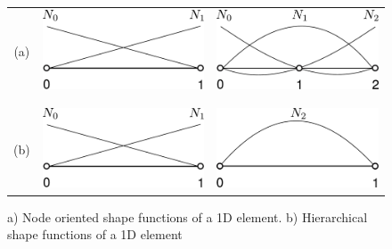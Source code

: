 \documentclass[11pt]{acmeArticle}
\numberwithin{equation}{section}
\begin{document}
\begin{figure}[h!]
\begin{center}
\begin{tabular}{c c c}
(a) & \includegraphics[height=2.cm]{Figures/LinearShapeFunction.pdf}  & {\includegraphics[height=2.cm]{Figures/2ndOrderNodeOr.pdf}}\\  
 &  & \\  
  &  & \\
(b) & \includegraphics[height=2.cm]{Figures/LinearShapeFunction.pdf}  & {\includegraphics[height=2.cm]{Figures/Hierarchical2nd.pdf}}
\end{tabular}
\caption{a) Node oriented shape functions of a 1D element. b) Hierarchical shape functions of a 1D element}
\label{fig:shape_funcs}
\end{center}
\end{figure}
\end{document}
